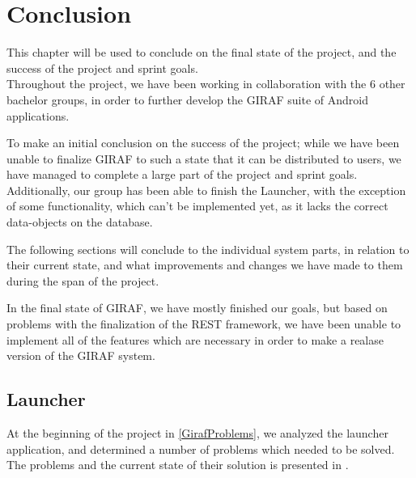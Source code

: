 \chapter{Conclusion}
This chapter will be used to conclude on the final state of the project, and the
success of the project and sprint goals. \\
Throughout the project, we have been working in collaboration with the 6 other
bachelor groups, in order to further develop the GIRAF suite of Android
applications.\nl

To make an initial conclusion on the success of the project; while we have been
unable to finalize GIRAF to such a state that it can be distributed to users, we
have managed to complete a large part of the project and sprint goals.
Additionally, our group has been able to finish the Launcher, with the exception
of some functionality, which can't be implemented yet, as it lacks the correct
data-objects on the database.\nl

The following sections will conclude to the individual system parts, in relation
to their current state, and what improvements and changes we have made to them
during the span of the project.\nl

In the final state of GIRAF, we have mostly finished our goals, but based on
problems with the finalization of the REST framework, we have been unable to
implement all of the features which are necessary in order to make a realase
version of the GIRAF system.

\section{Launcher}
At the beginning of the project in \autoref{GirafProblems}, we analyzed the
launcher application, and determined a number of problems which needed to be
solved. The problems and the current state of their solution is presented in
.


